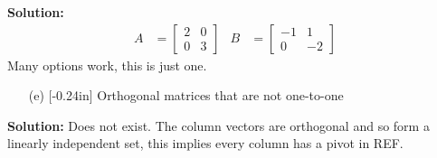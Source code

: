 \documentclass[letterpaper,12pt]{article}
\theoremstyle{definition}
\begin{document}
\begin{enumerate}
         \begin{mdframed}
            \textbf{Solution:}
         \begin{align*}
             A &= \begin{bmatrix}
             2 & 0 \\ 0 & 3
         \end{bmatrix} & B &= \begin{bmatrix}
             -1 & 1 \\ 0 & -2
         \end{bmatrix}
         \end{align*} Many options work, this is just one.
        \end{mdframed}
        \begin{enumerate}
        \item[(e)]\reversemarginpar{}[-0.24in] Orthogonal matrices that are not one-to-one
    \end{enumerate}
    \begin{mdframed}
            \textbf{Solution:}
         Does not exist. The column vectors are orthogonal and so form a linearly independent set, this implies every column has a pivot in REF.
        \end{mdframed}
\end{enumerate}
\newpage
\end{document}
